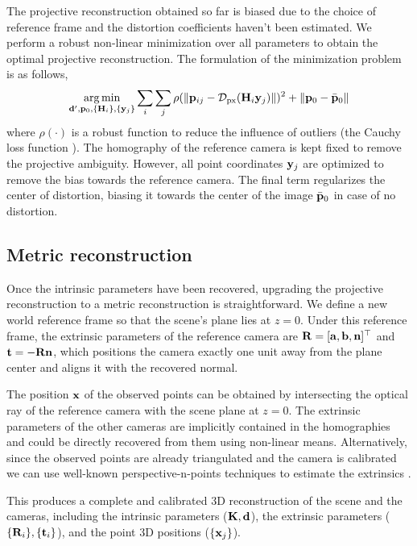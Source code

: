 \documentclass[10pt,twocolumn,letterpaper]{article}
\begin{document}
The projective reconstruction obtained so far is biased due to the choice of reference frame and the distortion coefficients haven't been estimated. We perform a robust non-linear minimization \cite{ceres-solver} over all parameters to obtain the optimal projective reconstruction. The formulation of the minimization problem is as follows, 
%
\begin{align}
\argmin_{\dv',\pv_0,\lbrace \Hm_i \rbrace, \lbrace \yv_j \rbrace} 
%
\sum_i \sum_j \rho(\norm{\pv_{ij} - \Distortion_{\text{px}}(\Hm_i \yv_j)})^2 + \norm{\pv_0 - \bar{\pv}_0}
\end{align}
%
where $\rho(\cdot)$ is a robust function to reduce the influence of outliers (\eg the Cauchy loss function \cite{ceres-solver}). The homography of the reference camera is kept fixed to remove the projective ambiguity. However, all point coordinates $\mathbf{y}_j$ are optimized to remove the bias towards the reference camera. The final term regularizes the center of distortion, biasing it towards the center of the image $\bar{\mathbf{p}}_0$ in case of no distortion.

\subsection{Metric reconstruction}
\label{section:metric}

Once the intrinsic parameters have been recovered, upgrading the projective reconstruction to a metric reconstruction is straightforward. We define a new world reference frame so that the scene's plane lies at $z=0$. Under this reference frame, the extrinsic parameters of the reference camera are $\mathbf{R}=[\mathbf{a}, \mathbf{b}, \mathbf{n}]^\top$ and $\mathbf{t}= - \mathbf{R} \mathbf{n}$, which positions the camera exactly one unit away from the plane center and aligns it with the recovered normal.

The position $\mathbf{x}$ of the observed points can be obtained by intersecting the optical ray of the reference camera with the scene plane at $z=0$. The extrinsic parameters of the other cameras are implicitly contained in the homographies and could be directly recovered from them using non-linear means. Alternatively, since the observed points are already triangulated and the camera is calibrated we can use well-known perspective-n-points techniques to estimate the extrinsics \cite{quan1999}.

This produces a complete and calibrated 3D reconstruction of the scene and the cameras, including the intrinsic parameters ($\mathbf{K},\mathbf{d}$), the extrinsic parameters ($\lbrace \mathbf{R}_i \rbrace,\lbrace \mathbf{t}_i \rbrace$), and the point 3D positions ($\lbrace \mathbf{x}_j \rbrace$).
\end{document}

